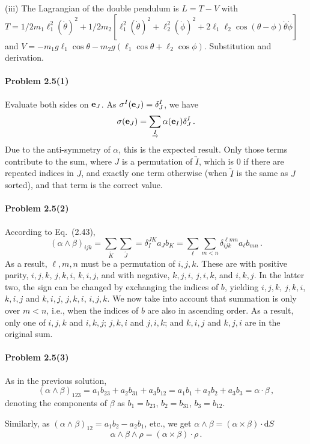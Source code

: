 \documentclass[a4paper,12pt]{article}
\def\d{\mathrm{d}}
\newcommand{\problem}[1]{\paragraph{Problem #1}}
\begin{document}
(iii) The Lagrangian of the double pendulum is $L = T-V$ with $T=1/2 m_1 \ell_1^2 (\dot\theta)^2 + 1/2 m_2 [\ell_1^2 (\dot{\theta})^2 + \ell_2^2 (\dot\phi)^2 + 2 \ell_1 \ell_2 \cos(\theta-\phi)\dot\theta\dot\phi]$ and $V = -m_1 g \ell_1 \cos\theta - m_2 g (\ell_1 \cos\theta + \ell_2 \cos\phi)$. Substitution and derivation.


\problem{2.5(1)} Evaluate both sides on ${\bf e}_{J}$. As $\sigma^{I}({\bf e}_J) = \delta^I_J$, we have
\[
 \sigma({\bf e}_J)= \sum_{\underrightarrow{I}}\alpha({\bf e}_I)\delta^I_J\,.
\]
Due to the anti-symmetry of $\alpha$, this is the expected result. Only those terms contribute to the sum, where $J$ is a permutation of $\underrightarrow{I}$, which is 0 if there are repeated indices in $J$, and exactly one term otherwise (when $\underrightarrow{I}$ is the same as $J$ sorted), and that term is the correct value.


\problem{2.5(2)} According to Eq.\ (2.43),
\[
 (\alpha\wedge \beta)_{ijk} = \sum_{\underrightarrow{K}}\sum_{\underrightarrow{J}} = \delta^{JK}_I a_{J} b_{K} = 
 \sum_{\ell}\sum_{m<n}\delta^{\ell mn}_{ijk} a_\ell b_{mn}\,.
\]
As a result, $\ell,m,n$ must be a permutation of $i,j,k$. These are
with positive parity, $i,j,k$, $j,k,i$, $k,i,j$, and with negative, $k,j,i$, $j,i,k$, and $i,k,j$. In the latter two, the sign can be changed by exchanging the indices of $b$, yielding
$i,j,k$, $j,k,i$, $k,i,j$ and $k,i,j$, $j,k,i$, $i,j,k$. We now take into account that summation is only over $m<n$, i.e., when the indices of $b$ are also in ascending order. As a result, only one of $i,j,k$ and $i,k,j$; $j,k,i$ and $j,i,k$; and $k,i,j$ and $k,j,i$ are in the original sum.


\problem{2.5(3)} As in the previous solution,
\[
(\alpha\wedge\beta)_{123}  = a_1 b_{23} + a_2 b_{31} + a_{3}b_{12} = a_1 b_1 + a_2 b_2 + a_3 b_3 = \alpha\cdot\beta\,,
\]
denoting the components of $\beta$ as $b_1 = b_{23}$, $b_2=b_{31}$, $b_3=b_{12}$.

Similarly, as $(\alpha\wedge\beta)_{12} = a_1 b_2 - a_2 b_1$, etc.,
we get $\alpha \wedge \beta = (\alpha\times\beta)\cdot\d S$
\[
\alpha\wedge\beta\wedge\rho = (\alpha\times\beta)\cdot \rho\,.
\]

\end{document}
